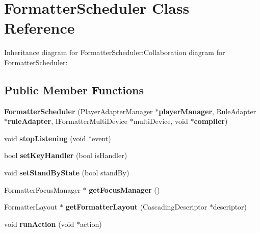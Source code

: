 \section{FormatterScheduler Class Reference}
\label{classbr_1_1pucrio_1_1telemidia_1_1ginga_1_1ncl_1_1FormatterScheduler}
Inheritance diagram for FormatterScheduler:Collaboration diagram for FormatterScheduler:\subsection*{Public Member Functions}
\begin{CompactItemize}
\item 
\textbf{FormatterScheduler} (PlayerAdapterManager $\ast${\bf playerManager}, RuleAdapter $\ast${\bf ruleAdapter}, IFormatterMultiDevice $\ast$multiDevice, void $\ast${\bf compiler})\label{classbr_1_1pucrio_1_1telemidia_1_1ginga_1_1ncl_1_1FormatterScheduler_c7fba821a3a680c50462d5061697297a}

\item 
void \textbf{stopListening} (void $\ast$event)\label{classbr_1_1pucrio_1_1telemidia_1_1ginga_1_1ncl_1_1FormatterScheduler_30fe02416806f60f10cfcc8e42cbefb3}

\item 
bool \textbf{setKeyHandler} (bool isHandler)\label{classbr_1_1pucrio_1_1telemidia_1_1ginga_1_1ncl_1_1FormatterScheduler_0e3bb20e5956653c0c0b112fb3b66a54}

\item 
void \textbf{setStandByState} (bool standBy)\label{classbr_1_1pucrio_1_1telemidia_1_1ginga_1_1ncl_1_1FormatterScheduler_ec91d5450ec8c5bd48870cb2e1f5596f}

\item 
FormatterFocusManager $\ast$ \textbf{getFocusManager} ()\label{classbr_1_1pucrio_1_1telemidia_1_1ginga_1_1ncl_1_1FormatterScheduler_a5721535660122566c1451dad207a84d}

\item 
FormatterLayout $\ast$ \textbf{getFormatterLayout} (CascadingDescriptor $\ast$descriptor)\label{classbr_1_1pucrio_1_1telemidia_1_1ginga_1_1ncl_1_1FormatterScheduler_6f82c59cdc5f61ce5ede0e43df99e29b}

\item 
void \textbf{runAction} (void $\ast$action)\label{classbr_1_1pucrio_1_1telemidia_1_1ginga_1_1ncl_1_1FormatterScheduler_6007065b1cfc53c07ceedd9c414c67b4}


\end{CompactItemize}
